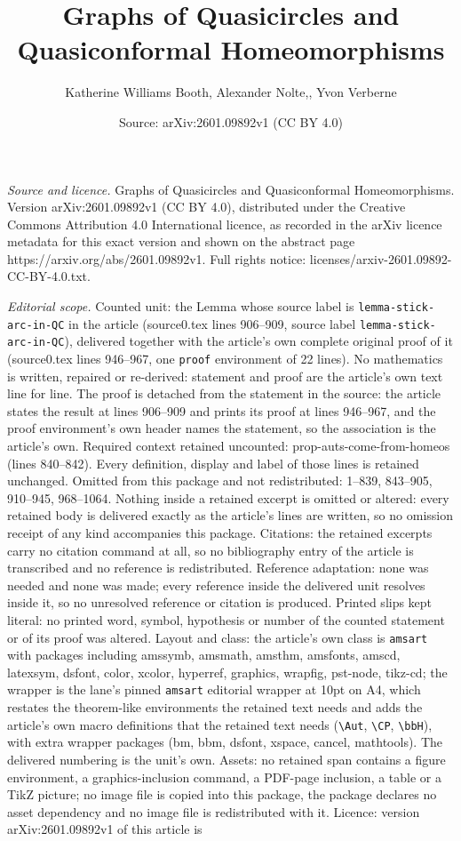 \documentclass[10pt,a4paper]{amsart}
\title[Graphs of Quasicircles and Quasiconformal Homeomorphisms]{Graphs of Quasicircles and Quasiconformal Homeomorphisms}
\author{Katherine Williams Booth, Alexander Nolte,, Yvon Verberne}
\date{Source: arXiv:2601.09892v1 (CC BY 4.0)}
\begin{document}
\maketitle

\noindent\emph{Source and licence.} Graphs of Quasicircles and Quasiconformal Homeomorphisms. Version arXiv:2601.09892v1 (CC BY 4.0), distributed under the Creative Commons Attribution 4.0 International licence, as recorded in the arXiv licence metadata for this exact version and shown on the abstract page https://arxiv.org/abs/2601.09892v1. Full rights notice: licenses/arxiv-2601.09892-CC-BY-4.0.txt.\par\smallskip

\noindent\textit{Editorial scope.} Counted unit: the Lemma whose source label is \texttt{lemma-stick-arc-in-QC} in the article (source0.tex lines 906--909, source label \texttt{lemma-stick-arc-in-QC}), delivered together with the article's own complete original proof of it (source0.tex lines 946--967, one \texttt{proof} environment of 22 lines). No mathematics is written, repaired or re-derived: statement and proof are the article's own text line for line. The proof is detached from the statement in the source: the article states the result at lines 906--909 and prints its proof at lines 946--967, and the proof environment's own header names the statement, so the association is the article's own. Required context retained uncounted: prop-auts-come-from-homeos (lines 840--842). Every definition, display and label of those lines is retained unchanged. Omitted from this package and not redistributed: 1--839, 843--905, 910--945, 968--1064. Nothing inside a retained excerpt is omitted or altered: every retained body is delivered exactly as the article's lines are written, so no omission receipt of any kind accompanies this package. Citations: the retained excerpts carry no citation command at all, so no bibliography entry of the article is transcribed and no reference is redistributed. Reference adaptation: none was needed and none was made; every reference inside the delivered unit resolves inside it, so no unresolved reference or citation is produced. Printed slips kept literal: no printed word, symbol, hypothesis or number of the counted statement or of its proof was altered. Layout and class: the article's own class is \texttt{amsart} with packages including amssymb, amsmath, amsthm, amsfonts, amscd, latexsym, dsfont, color, xcolor, hyperref, graphics, wrapfig, pst-node, tikz-cd; the wrapper is the lane's pinned \texttt{amsart} editorial wrapper at 10pt on A4, which restates the theorem-like environments the retained text needs and adds the article's own macro definitions that the retained text needs (\texttt{\textbackslash Aut}, \texttt{\textbackslash CP}, \texttt{\textbackslash bbH}), with extra wrapper packages (bm, bbm, dsfont, xspace, cancel, mathtools). The delivered numbering is the unit's own. Assets: no retained span contains a figure environment, a graphics-inclusion command, a PDF-page inclusion, a table or a TikZ picture; no image file is copied into this package, the package declares no asset dependency and no image file is redistributed with it. Licence: version arXiv:2601.09892v1 of this article is 
\end{document}
